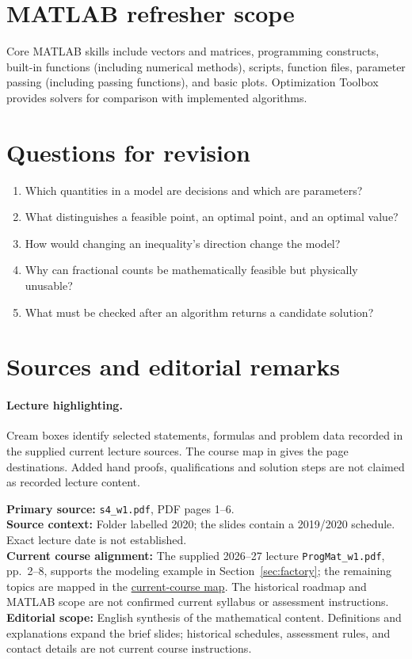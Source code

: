 \documentclass[11pt,a4paper]{article}
\begin{document}
\newpage
\section{MATLAB refresher scope}\label{sec:matlab}
Core MATLAB skills include vectors and matrices,
programming constructs, built-in functions (including numerical methods), scripts,
function files, parameter passing (including passing functions), and basic plots.
Optimization Toolbox provides solvers for comparison with implemented algorithms.

\section{Questions for revision}\label{sec:revision}
\begin{enumerate}[leftmargin=1.8em]
  \item Which quantities in a model are decisions and which are parameters?
  \item What distinguishes a feasible point, an optimal point, and an optimal value?
  \item How would changing an inequality's direction change the model?
  \item Why can fractional counts be mathematically feasible but physically unusable?
  \item What must be checked after an algorithm returns a candidate solution?
\end{enumerate}

\section{Sources and editorial remarks}\label{sec:sources}
\paragraph{Lecture highlighting.}
Cream boxes identify selected statements, formulas and problem data recorded in
the supplied current lecture sources. The course map in
 gives the page destinations. Added hand proofs,
qualifications and solution steps are not claimed as recorded lecture content.

\noindent\textbf{Primary source:} \texttt{s4\_w1.pdf}, PDF pages 1--6.\\
\textbf{Source context:} Folder labelled 2020; the slides contain a 2019/2020
schedule. Exact lecture date is not established.\\
\textbf{Current course alignment:} The supplied 2026--27 lecture
\texttt{ProgMat\_w1.pdf}, pp.~2--8, supports the modeling example in
Section~\ref{sec:factory}; the remaining topics are mapped in the
\href{../../docs/course-map-2026-27.md}{current-course map}.
The historical roadmap and MATLAB scope
are not confirmed current syllabus or assessment instructions.\\
\textbf{Editorial scope:} English synthesis of the mathematical content.
Definitions and explanations expand the brief slides; historical schedules,
assessment rules, and contact details are not current course instructions.
\end{document}
